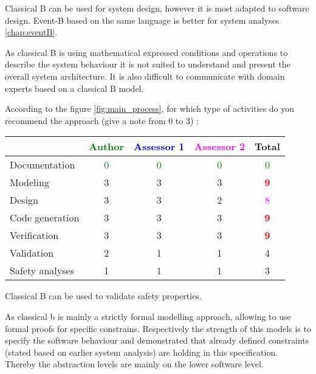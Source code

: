 \begin{author_comment}
Classical B can be used for system design, however it is most adapted to software design. Event-B  based on the same language is better for system analyses \ref{chap:eventB}.
\end{author_comment}


\begin{assessor2}
As classical B is using mathematical expressed conditions and operations to describe the system behaviour it is not suited to understand and present the overall system architecture. It is also difficult to communicate with domain experts based on a classical B model.
\end{assessor2}

According to the figure \ref{fig:main_process}, for which type of activities do you recommend the approach (give a note from 0 to  3) :

\begin{tabular}{|l | c | c | c | c|}
\hline
& \textcolor{green}{Author} & \textcolor{blue}{Assessor 1} & \textcolor{magenta}{Assessor 2} & Total \\
\hline 
Documentation & \textcolor{green}{0} & \textcolor{green}{0} & \textcolor{green}{0} & \textcolor{green}{0} \\
\hline
Modeling & 3    & 3    & 3    & \textcolor{red}{\textbf{9}} \\
\hline
Design & 3    & 3    & 2    & \textcolor{magenta}{8} \\
\hline
Code generation & 3    & 3    & 3    & \textcolor{red}{\textbf{9}} \\
\hline
Verification & 3    & 3    & 3    & \textcolor{red}{\textbf{9}} \\
\hline
Validation & 2    & 1    & 1    & 4    \\
\hline
Safety analyses & 1    & 1    & 1    & 3    \\
\hline
\end{tabular}


\begin{author_comment}
Classical B  can be used to  validate safety properties.
\end{author_comment}

\begin{assessor2}
As classical b is mainly a strictly formal modelling approach, allowing to use formal proofs for specific constrains. Respectively the strength of this models is to specify the software behaviour and demonstrated that already defined constraints (stated based on earlier system analysis) are holding in this specification. Thereby the abstraction levels are mainly on the lower software level.
\end{assessor2}

